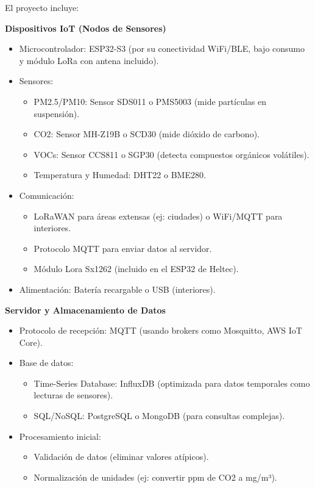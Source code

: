 \documentclass[
11pt, %
]{charter}
\begin{document}
El proyecto incluye:

\textbf{Dispositivos IoT (Nodos de Sensores)}
\begin{itemize}
	\item Microcontrolador: ESP32-S3 (por su conectividad WiFi/BLE, bajo consumo y módulo LoRa con antena incluido).
	\item Sensores:
	\begin{itemize}
		\item PM2.5/PM10: Sensor SDS011 o PMS5003 (mide partículas en suspensión).
		\item CO2: Sensor MH-Z19B o SCD30 (mide dióxido de carbono).
		\item VOCs: Sensor CCS811 o SGP30 (detecta compuestos orgánicos volátiles).
		\item Temperatura y Humedad: DHT22 o BME280.
	\end{itemize}

	\item Comunicación:
	\begin{itemize}
		\item LoRaWAN para áreas extensas (ej: ciudades) o WiFi/MQTT para interiores.
		\item Protocolo MQTT para enviar datos al servidor.
		\item Módulo Lora Sx1262 (incluido en el ESP32 de Heltec).
	\end{itemize}

	\item Alimentación: Batería recargable o USB (interiores).
\end{itemize}

\textbf{Servidor y Almacenamiento de Datos}
\begin{itemize}

	\item Protocolo de recepción: MQTT (usando brokers como Mosquitto, AWS IoT Core).
	
	\item Base de datos:
	\begin{itemize}
		\item Time-Series Database: InfluxDB (optimizada para datos temporales como lecturas de sensores).
		\item SQL/NoSQL: PostgreSQL o MongoDB (para consultas complejas).	
	\end{itemize}
	
	\item Procesamiento inicial:
	\begin{itemize}
		\item Validación de datos (eliminar valores atípicos).
		\item Normalización de unidades (ej: convertir ppm de CO2 a mg/m³).
	\end{itemize}

\end{itemize}
\end{document}
